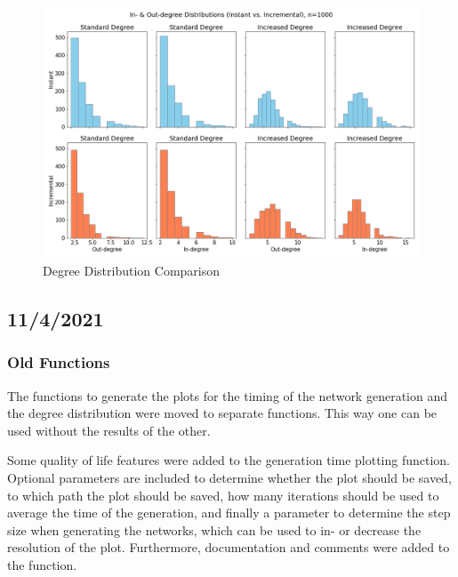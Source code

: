 \documentclass{article}
\begin{document}
\begin{center}
    \begin{figure}[!htbp]
        \centering
        \includegraphics[width=1\textwidth]{ThesisKI/Images/IncrementalVSInstantDegree.png}
        \caption{Degree Distribution Comparison}
        \label{degree:increase}
    \end{figure}
\end{center}

\newpage
\subsection{11/4/2021}
\subsubsection{Old Functions}
The functions to generate the plots for the timing of the network generation and the degree distribution were moved to separate functions. This way one can be used without the results of the other.

Some quality of life features were added to the generation time plotting function. Optional parameters are included to determine whether the plot should be saved, to which path the plot should be saved, how many iterations should be used to average the time of the generation, and finally a parameter to determine the step size when generating the networks, which can be used to in- or decrease the resolution of the plot.\newline
Furthermore, documentation and comments were added to the function.
\end{document}
